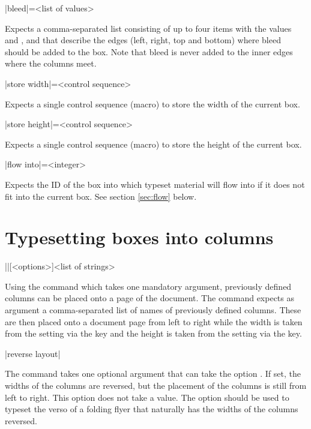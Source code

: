 \documentclass[a4paper]{article}
\begin{document}
\begin{macrodef}
|bleed|={<list of values>}
\end{macrodef}
Expects a comma-separated list consisting of up to four items with the values  and ,  and  that describe the edges (left, right, top and bottom) where bleed should be added to the box. Note that bleed is never added to the inner edges where the columns meet.

\begin{macrodef}
|store width|={<control sequence>}
\end{macrodef}
Expects a single control sequence (macro) to store the width of the current box.

\begin{macrodef}
|store height|={<control sequence>}
\end{macrodef}
Expects a single control sequence (macro) to store the height of the current box.

\begin{macrodef}
|flow into|={<integer>}
\end{macrodef}
Expects the ID of the box into which typeset material will flow into if it does not fit into the current box. See section \ref{sec:flow} below.

\section{Typesetting boxes into columns}

\begin{macrodef}
|\leporellotypesetcolumns|[<options>]{<list of strings>}
\end{macrodef}
Using the command \macro{\leporellotypesetcolumns} which takes one mandatory argument, previously defined columns can be placed onto a page of the document. The command expects as argument a comma-separated list of names of previously defined columns. These are then placed onto a document page from left to right while the width is taken from the setting via the  key and the height is taken from the setting via the  key.

\begin{macrodef}
|reverse layout|
\end{macrodef}
The command takes one optional argument that can take the option . If set, the widths of the columns are reversed, but the placement of the columns is still from left to right. This option does not take a value. The option should be used to typeset the verso of a folding flyer that naturally has the widths of the columns reversed.
\end{document}
